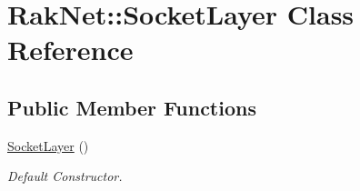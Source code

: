 \hypertarget{class_rak_net_1_1_socket_layer}{\section{Rak\-Net\-:\-:Socket\-Layer Class Reference}
\label{class_rak_net_1_1_socket_layer}
}
\subsection*{Public Member Functions}
\begin{DoxyCompactItemize}
\item 
\hypertarget{class_rak_net_1_1_socket_layer_a6d641db61068fe8d656e2a92d7bbd42c}{\hyperlink{class_rak_net_1_1_socket_layer_a6d641db61068fe8d656e2a92d7bbd42c}{Socket\-Layer} ()}\label{class_rak_net_1_1_socket_layer_a6d641db61068fe8d656e2a92d7bbd42c}

\begin{DoxyCompactList}\small\item\em Default Constructor. \end{DoxyCompactList}\end{DoxyCompactItemize}
